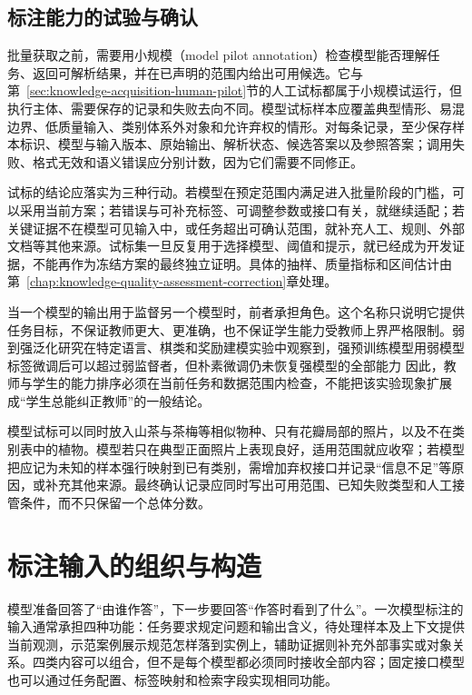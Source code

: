 \subsection{标注能力的试验与确认}
\label{sec:knowledge-acquisition-model-pilot-validation}

批量获取之前，需要用小规模（model pilot annotation）检查模型能否理解任务、返回可解析结果，并在已声明的范围内给出可用候选。它与第~\ref{sec:knowledge-acquisition-human-pilot}节的人工试标都属于小规模试运行，但执行主体、需要保存的记录和失败去向不同。模型试标样本应覆盖典型情形、易混边界、低质量输入、类别体系外对象和允许弃权的情形。对每条记录，至少保存样本标识、模型与输入版本、原始输出、解析状态、候选答案以及参照答案；调用失败、格式无效和语义错误应分别计数，因为它们需要不同修正。

试标的结论应落实为三种行动。若模型在预定范围内满足进入批量阶段的门槛，可以采用当前方案；若错误与可补充标签、可调整参数或接口有关，就继续适配；若关键证据不在模型可见输入中，或任务超出可确认范围，就补充人工、规则、外部文档等其他来源。试标集一旦反复用于选择模型、阈值和提示，就已经成为开发证据，不能再作为冻结方案的最终独立证明。具体的抽样、质量指标和区间估计由第~\ref{chap:knowledge-quality-assessment-correction}章处理。

\Needspace{100mm}
当一个模型的输出用于监督另一个模型时，前者承担角色。这个名称只说明它提供任务目标，不保证教师更大、更准确，也不保证学生能力受教师上界严格限制。弱到强泛化研究在特定语言、棋类和奖励建模实验中观察到，强预训练模型用弱模型标签微调后可以超过弱监督者，但朴素微调仍未恢复强模型的全部能力
因此，教师与学生的能力排序必须在当前任务和数据范围内检查，不能把该实验现象扩展成“学生总能纠正教师”的一般结论。

模型试标可以同时放入山茶与茶梅等相似物种、只有花瓣局部的照片，以及不在类别表中的植物。模型若只在典型正面照片上表现良好，适用范围就应收窄；若模型把应记为未知的样本强行映射到已有类别，需增加弃权接口并记录“信息不足”等原因，或补充其他来源。最终确认记录应同时写出可用范围、已知失败类型和人工接管条件，而不只保留一个总体分数。

\section{标注输入的组织与构造}
\label{sec:knowledge-acquisition-input-organization}

模型准备回答了“由谁作答”，下一步要回答“作答时看到了什么”。一次模型标注的输入通常承担四种功能：任务要求规定问题和输出含义，待处理样本及上下文提供当前观测，示范案例展示规范怎样落到实例上，辅助证据则补充外部事实或对象关系。四类内容可以组合，但不是每个模型都必须同时接收全部内容；固定接口模型也可以通过任务配置、标签映射和检索字段实现相同功能。

